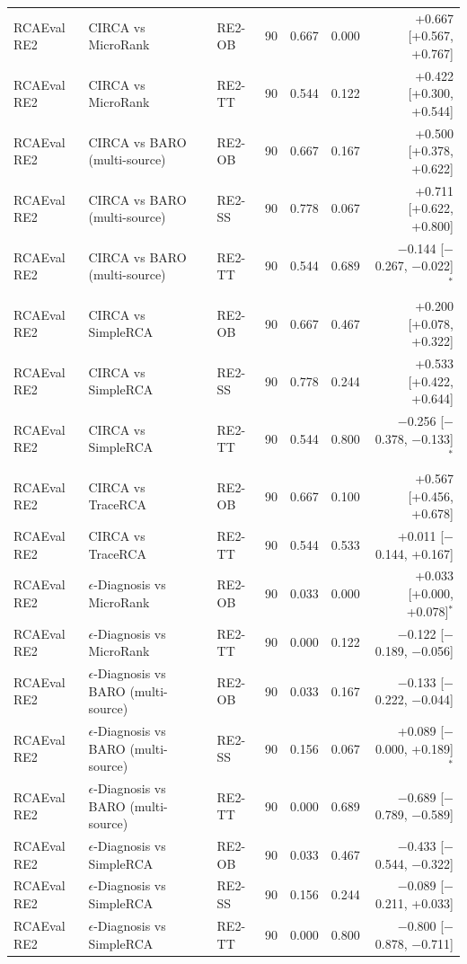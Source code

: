 {\begin{longtable}{llllrrr}
RCAEval RE2 & CIRCA vs MicroRank & RE2-OB & 90 & 0.667 & 0.000 & +0.667 [+0.567, +0.767] \\
RCAEval RE2 & CIRCA vs MicroRank & RE2-TT & 90 & 0.544 & 0.122 & +0.422 [+0.300, +0.544] \\
RCAEval RE2 & CIRCA vs BARO (multi-source) & RE2-OB & 90 & 0.667 & 0.167 & +0.500 [+0.378, +0.622] \\
RCAEval RE2 & CIRCA vs BARO (multi-source) & RE2-SS & 90 & 0.778 & 0.067 & +0.711 [+0.622, +0.800] \\
RCAEval RE2 & CIRCA vs BARO (multi-source) & RE2-TT & 90 & 0.544 & 0.689 & $-$0.144 [$-$0.267, $-$0.022]$^\ast$ \\
RCAEval RE2 & CIRCA vs SimpleRCA & RE2-OB & 90 & 0.667 & 0.467 & +0.200 [+0.078, +0.322] \\
RCAEval RE2 & CIRCA vs SimpleRCA & RE2-SS & 90 & 0.778 & 0.244 & +0.533 [+0.422, +0.644] \\
RCAEval RE2 & CIRCA vs SimpleRCA & RE2-TT & 90 & 0.544 & 0.800 & $-$0.256 [$-$0.378, $-$0.133]$^\ast$ \\
RCAEval RE2 & CIRCA vs TraceRCA & RE2-OB & 90 & 0.667 & 0.100 & +0.567 [+0.456, +0.678] \\
RCAEval RE2 & CIRCA vs TraceRCA & RE2-TT & 90 & 0.544 & 0.533 & +0.011 [$-$0.144, +0.167] \\
RCAEval RE2 & $\epsilon$-Diagnosis vs MicroRank & RE2-OB & 90 & 0.033 & 0.000 & +0.033 [+0.000, +0.078]$^\ast$ \\
RCAEval RE2 & $\epsilon$-Diagnosis vs MicroRank & RE2-TT & 90 & 0.000 & 0.122 & $-$0.122 [$-$0.189, $-$0.056] \\
RCAEval RE2 & $\epsilon$-Diagnosis vs BARO (multi-source) & RE2-OB & 90 & 0.033 & 0.167 & $-$0.133 [$-$0.222, $-$0.044] \\
RCAEval RE2 & $\epsilon$-Diagnosis vs BARO (multi-source) & RE2-SS & 90 & 0.156 & 0.067 & +0.089 [$-$0.000, +0.189]$^\ast$ \\
RCAEval RE2 & $\epsilon$-Diagnosis vs BARO (multi-source) & RE2-TT & 90 & 0.000 & 0.689 & $-$0.689 [$-$0.789, $-$0.589] \\
RCAEval RE2 & $\epsilon$-Diagnosis vs SimpleRCA & RE2-OB & 90 & 0.033 & 0.467 & $-$0.433 [$-$0.544, $-$0.322] \\
RCAEval RE2 & $\epsilon$-Diagnosis vs SimpleRCA & RE2-SS & 90 & 0.156 & 0.244 & $-$0.089 [$-$0.211, +0.033] \\
RCAEval RE2 & $\epsilon$-Diagnosis vs SimpleRCA & RE2-TT & 90 & 0.000 & 0.800 & $-$0.800 [$-$0.878, $-$0.711] \\

\end{longtable}}
